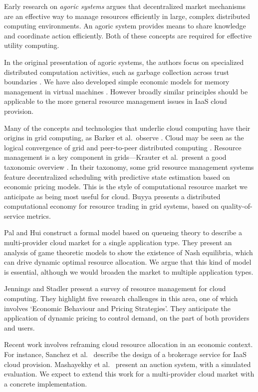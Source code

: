 \documentclass[conference,10pt]{IEEEtran}
\begin{document}
Early research on \emph{agoric systems}  \cite{miller88markets} argues that decentralized market mechanisms are an effective way to manage resources efficiently in large, complex distributed computing environments. An agoric system provides means to share knowledge and coordinate action efficiently. Both of these concepts are required for effective utility computing.

In the original presentation of agoric systems, the authors focus on specialized distributed computation activities, such as garbage collection across trust boundaries \cite{miller88incentive}. We have also developed simple economic models for memory management in virtual machines \cite{singer10economics,cameron15judgment}.  However broadly similar principles should be applicable to the more general resource management issues in IaaS cloud provision.


Many of the concepts and technologies that underlie cloud computing have their origins in grid computing, as Barker et al.\ observe \cite{barker14academic}.
Cloud may be seen as the logical convergence of grid and peer-to-peer distributed computing \cite{foster03death}.
Resource management is a key component in grids---Krauter et al.\ present a good taxonomic overview \cite{krauter02taxonomy}. In their taxonomy, some grid resource management systems feature decentralized scheduling with predictive state estimation based on economic pricing models. This is the style of computational resource market we anticipate as being most useful for cloud.
Buyya \cite{buyya02economic} presents a distributed computational economy for resource trading in grid systems, based on quality-of-service metrics.

Pal and Hui \cite{pal13economic} construct a formal model based on queueing theory to describe a multi-provider cloud market for a single application type. They present an analysis of game theoretic models to show the existence of Nash equilibria, which can drive dynamic optimal resource allocation.
We argue that this kind of model is essential, although we would broaden the market to multiple application types.

Jennings and Stadler \cite{jennings15resource} present a survey of resource management for cloud computing. They highlight five research challenges in this area, one of which involves `Economic Behaviour and Pricing Strategies'. They anticipate the application of dynamic pricing to control demand, on the part of both providers and users.

Recent work involves reframing cloud resource allocation in an economic context.  For instance, Sanchez et al.\ 
\cite{sanchez14compatible} describe the design of a brokerage service for IaaS cloud provision. 
Mashayekhy et al.\ \cite{mashayekhy14two} present an auction system, with a simulated evaluation. We expect to extend this work for  a multi-provider cloud market  with a concrete implementation.
\end{document}

